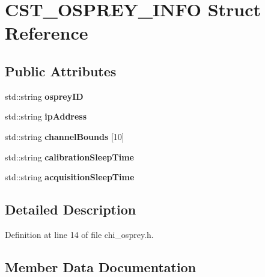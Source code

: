 \hypertarget{struct_c_s_t___o_s_p_r_e_y___i_n_f_o}{}\section{C\+S\+T\+\_\+\+O\+S\+P\+R\+E\+Y\+\_\+\+I\+N\+FO Struct Reference}
\label{struct_c_s_t___o_s_p_r_e_y___i_n_f_o}
\subsection*{Public Attributes}
\begin{DoxyCompactItemize}
\item 
\mbox{\label{struct_c_s_t___o_s_p_r_e_y___i_n_f_o_a4aeec24f34c07993a2f44ac2f59bd163}} 
std\+::string {\bfseries osprey\+ID}
\item 
\mbox{\label{struct_c_s_t___o_s_p_r_e_y___i_n_f_o_ac22eefe0f719df5a7980dc27559cf7c2}} 
std\+::string {\bfseries ip\+Address}
\item 
\mbox{\label{struct_c_s_t___o_s_p_r_e_y___i_n_f_o_a15cf8fd34c53039735f2553201d111cd}} 
std\+::string {\bfseries channel\+Bounds} \mbox{[}10\mbox{]}
\item 
\mbox{\label{struct_c_s_t___o_s_p_r_e_y___i_n_f_o_a84b57c81785927b3f664ca366c674aa4}} 
std\+::string {\bfseries calibration\+Sleep\+Time}
\item 
\mbox{\label{struct_c_s_t___o_s_p_r_e_y___i_n_f_o_a3668cf64637a9d61481f740f39b9e7d8}} 
std\+::string {\bfseries acquisition\+Sleep\+Time}
\end{DoxyCompactItemize}


\subsection{Detailed Description}


Definition at line 14 of file chi\+\_\+osprey.\+h.



\subsection{Member Data Documentation}
\mbox{\label{struct_c_s_t___o_s_p_r_e_y___i_n_f_o_a3668cf64637a9d61481f740f39b9e7d8}} 
